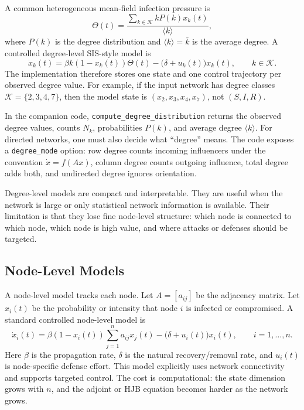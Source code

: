 \documentclass[11pt,a4paper]{article}
\begin{document}
A common heterogeneous mean-field infection pressure is
\begin{equation}
  \Theta(t)=\frac{\sum_{k\in\mathcal{K}} kP(k)x_k(t)}{\langle k\rangle},
  \label{eq:theta-degree}
\end{equation}
where $P(k)$ is the degree distribution and $\langle k\rangle=\bar{k}$ is the average degree. A controlled degree-level SIS-style model is
\begin{equation}
  \dot{x}_k(t)=\beta k(1-x_k(t))\Theta(t)-\bigl(\delta+u_k(t)\bigr)x_k(t),
  \qquad k\in\mathcal{K}.
  \label{eq:degree-sis}
\end{equation}
The implementation therefore stores one state and one control trajectory per observed degree value. For example, if the input network has degree classes $\mathcal{K}=\{2,3,4,7\}$, then the model state is $(x_2,x_3,x_4,x_7)$, not $(S,I,R)$.

In the companion code, \texttt{compute\_degree\_distribution} returns the observed degree values, counts $N_k$, probabilities $P(k)$, and average degree $\langle k\rangle$. For directed networks, one must also decide what ``degree'' means. The code exposes a \texttt{degree\_mode} option: row degree counts incoming influencers under the convention $\dot{x}=f(Ax)$, column degree counts outgoing influence, total degree adds both, and undirected degree ignores orientation.

Degree-level models are compact and interpretable. They are useful when the network is large or only statistical network information is available. Their limitation is that they lose fine node-level structure: which node is connected to which node, which node is high value, and where attacks or defenses should be targeted.

\subsection{Node-Level Models}

A node-level model tracks each node. Let $A=[a_{ij}]$ be the adjacency matrix. Let $x_i(t)$ be the probability or intensity that node $i$ is infected or compromised. A standard controlled node-level model is
\begin{equation}
  \dot{x}_i(t)=\beta(1-x_i(t))\sum_{j=1}^n a_{ij}x_j(t)-\bigl(\delta+u_i(t)\bigr)x_i(t),\qquad i=1,\dots,n.
  \label{eq:node-sis}
\end{equation}
Here $\beta$ is the propagation rate, $\delta$ is the natural recovery/removal rate, and $u_i(t)$ is node-specific defense effort. This model explicitly uses network connectivity and supports targeted control. The cost is computational: the state dimension grows with $n$, and the adjoint or HJB equation becomes harder as the network grows.
\end{document}

